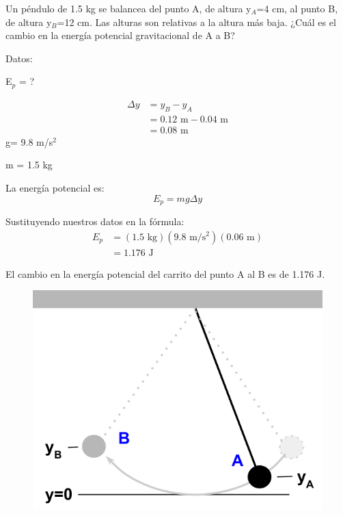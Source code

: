 \question[10] Un péndulo de 1.5 kg se balancea del punto A, de altura y$_A$=4 cm, al punto B, de altura y$_B$=12 cm. Las alturas son relativas a la altura más baja. ¿Cuál es el cambio en la energía potencial gravitacional de A a B?

\begin{minipage}{0.68\textwidth}
    \begin{solutionbox}{6cm}
        \begin{multicols}{2}
            Datos:

            E$_p$ = ?

            \[
                \begin{array}{rl}
                    \Delta y & = y_B - y_A                       \\
                             & = 0.12 \text{ m} - 0.04 \text{ m} \\
                             & = 0.08 \text{ m}
                \end{array}
            \]
            g= 9.8 m/s$^2$

            m = 1.5 kg

            \vspace{2cm}

            La energía potencial es:
            \[E_p=mg\Delta y\]


            Sustituyendo nuestros datos en la fórmula:
            \[
                \begin{array}{rl}
                    E_p & = (1.5 \text{ kg})(9.8 \text{ m/s$^2$})(0.06 \text{ m}) \\[1em]
                        & =1.176 \text{ J }
                \end{array}
            \]

        \end{multicols}
        \begin{center}El cambio en la energía potencial del carrito del punto A al B es de 1.176 J.\end{center}
    \end{solutionbox}
\end{minipage}\hfill
\begin{minipage}{0.25\textwidth}
    \begin{figure}[H]
        \includegraphics[width=\linewidth]{../images/6a76ea922093e6e5057e27a98cc0f8852d616580}
    \end{figure}
\end{minipage}
